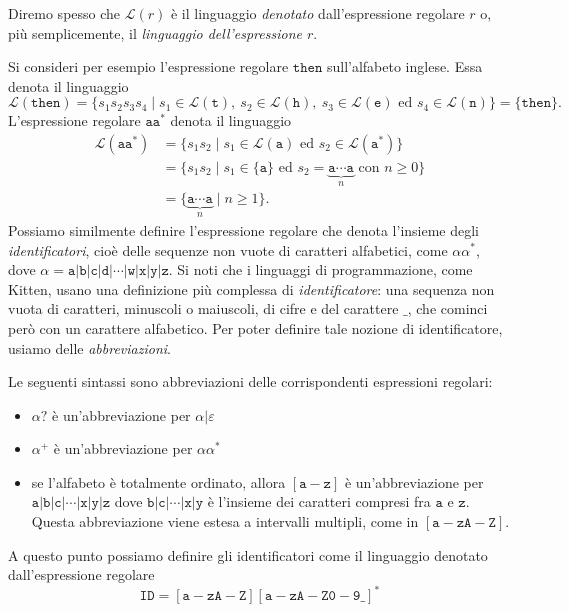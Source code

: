 Diremo spesso
che $\mathcal{L}(r)$ \`e il linguaggio \emph{denotato} dall'espressione
regolare $r$ o, pi\`u semplicemente, il \emph{linguaggio dell'espressione $r$}.

Si consideri per esempio l'espressione regolare $\mathtt{then}$ sull'alfabeto
inglese. Essa denota il linguaggio
%
\[
  \mathcal{L}(\mathtt{then})=\{s_1s_2s_3s_4\mid s_1\in\mathcal{L}(\mathtt{t}),
    \ s_2\in\mathcal{L}(\mathtt{h}),\ s_3\in\mathcal{L}(\mathtt{e})
    \text{ ed }s_4\in\mathcal{L}(\mathtt{n})\}
    =\{\mathtt{then}\}.
\]
L'espressione regolare $\mathtt{aa^*}$ denota il linguaggio
\begin{align*}
  \mathcal{L}(\mathtt{aa^*})&=\{s_1s_2\mid s_1\in\mathcal{L}(\mathtt{a})
    \text{ ed }s_2\in\mathcal{L}(\mathtt{a^*})\}\\
  &=\{s_1s_2\mid s_1\in\{\mathtt{a}\}\text{ ed }
    s_2=\underbrace{\mathtt{a\cdots a}}_n\text{ con }n\ge 0\}\\
  &=\{\underbrace{\mathtt{a\cdots a}}_n\mid n\ge 1\}.
\end{align*}
%
Possiamo similmente definire l'espressione regolare
che denota l'insieme degli \emph{identificatori},
cio\`e delle sequenze non vuote
di caratteri alfabetici, come $\alpha\alpha^*$, dove $\alpha=\mathtt
{a|b|c|d|\cdots|w|x|y|z}$. Si noti che i linguaggi di programmazione, come
Kitten, usano una definizione pi\`u complessa di \emph{identificatore}:
una sequenza non vuota di caratteri, minuscoli o maiuscoli, di cifre e del
carattere $\_$, che cominci per\`o con un carattere alfabetico. Per poter
definire tale nozione di identificatore, usiamo delle \emph{abbreviazioni}.
%
\begin{definition}[Abbreviazioni]\label{def:abridged}
Le seguenti sintassi sono abbreviazioni delle corrispondenti espressioni
regolari:
%
\begin{itemize}
\item $\alpha\mathtt{?}$ \`e un'abbreviazione per $\alpha|\varepsilon$
\item $\alpha^+$ \`e un'abbreviazione per $\alpha\alpha^*$
\item se l'alfabeto \`e totalmente ordinato, allora $\mathtt{[a-z]}$ \`e
      un'abbreviazione per $\mathtt{a|b|c|\cdots|x|y|z}$ dove
      $\mathtt{b|c|\cdots|x|y}$ \`e l'insieme dei caratteri compresi
      fra $\mathtt{a}$ e $\mathtt{z}$. Questa abbreviazione viene estesa
      a intervalli multipli, come in $\mathtt{[a-zA-Z]}$.
\end{itemize}
%
A questo punto possiamo definire gli identificatori come il linguaggio denotato
dall'espressione regolare
%
\[
  \mathtt{ID}=\mathtt{[a-zA-Z][a-zA-Z0-9\_]^*}
\]
%
\end{definition}
